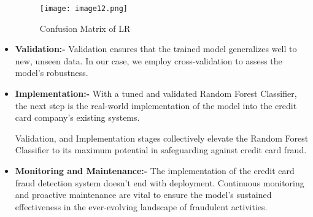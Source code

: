 \begin{itemize}
     \begin{figure}[h]
         \centering
         \texttt{[image: image12.png]}
         \caption{Confusion Matrix of LR}
         \label{fig:enter-label}
     \end{figure}

    \item \textbf{Validation:-} Validation ensures that the trained model generalizes well to new, unseen data. In our case, we employ cross-validation to assess the model's robustness.

    \item \textbf{Implementation:-} With a tuned and validated Random Forest Classifier, the next step is the real-world implementation of the model into the credit card company's existing systems.

    Validation, and Implementation stages collectively elevate the Random Forest Classifier to its maximum potential in safeguarding against credit card fraud.

    \item \textbf{Monitoring and Maintenance:-} The implementation of the credit card fraud detection system doesn't end with deployment. Continuous monitoring and proactive maintenance are vital to ensure the model's sustained effectiveness in the ever-evolving landscape of fraudulent activities.

\end{itemize}


